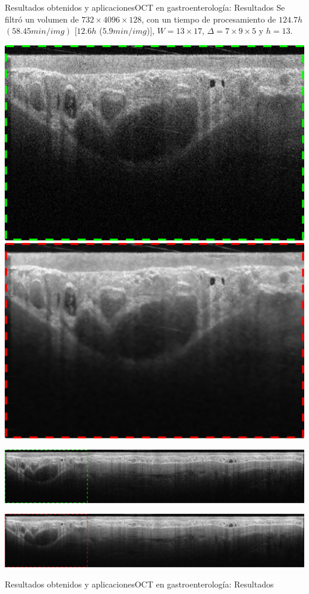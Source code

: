 \documentclass[fleqn,10pt]{beamer}
\begin{document}
\begin{frame}{Resultados obtenidos y aplicaciones}{OCT en gastroenterología: Resultados}
	Se filtró un volumen de $732\times4096\times128$, con un tiempo de procesamiento de $124.7h$ $(58.45min/img)$ {\color{violet}[$12.6h$ ($5.9min/img$)]}, $W=13\times17$, $\Delta = 7\times 9 \times 5$ y $h=13$.
	\vfill
	
	\centering
	\includegraphics[width=0.45\linewidth]{AAUgraphics/pt3/GI/ima_nsy_short_GI_lines}
	\includegraphics[width=0.45\linewidth]{AAUgraphics/pt3/GI/ima_filt_short_GI_liens}
	\vfill
	
	\includegraphics[width=1\linewidth]{AAUgraphics/pt3/GI/ima_nsy_GI_lines}
	
	\includegraphics[width=1\linewidth]{AAUgraphics/pt3/GI/ima_filt_GI_lines}
\end{frame}

\begin{frame}{Resultados obtenidos y aplicaciones}{OCT en gastroenterología: Resultados}
	\addtocounter{framenumber}{-1}
	\vspace*{-0.2cm}
	\begin{center}
	\end{center}
\end{frame}
\end{document}
